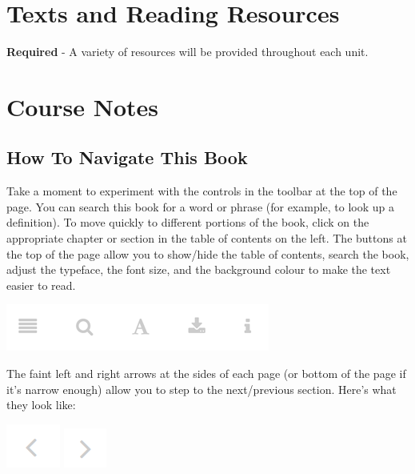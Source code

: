\documentclass[
]{book}
\begin{document}
\hypertarget{texts-and-reading-resources}{%
\section*{Texts and Reading Resources}\label{texts-and-reading-resources}}

\textbf{Required}
- A variety of resources will be provided throughout each unit.

\hypertarget{course-notes}{%
\section*{Course Notes}\label{course-notes}}

\hypertarget{how-to-navigate-this-book}{%
\subsection*{How To Navigate This Book}\label{how-to-navigate-this-book}}

Take a moment to experiment with the controls in the toolbar at the top of the page. You can search this book for a word or phrase (for example, to look up a definition). To move quickly to different portions of the book, click on the appropriate chapter or section in the table of contents on the left. The buttons at the top of the page allow you to show/hide the table of contents, search the book, adjust the typeface, the font size, and the background colour to make the text easier to read.

\includegraphics{assets/course-intro/menu.png}

The faint left and right arrows at the sides of each page (or bottom of the page if it's narrow enough) allow you to step to the next/previous section. Here's what they look like:

\includegraphics{assets/course-intro/left_arrow.png} \includegraphics{assets/course-intro/right_arrow.png}
\end{document}
